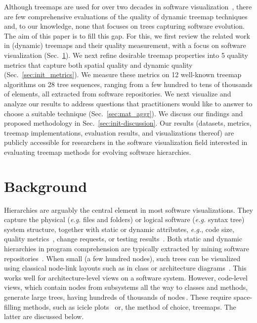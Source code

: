 Although treemaps are used for over two decades in software visualization~\citep{shneiderman92,schulz11_treesurvey,treevis,landesberger11}, there are few comprehensive evaluations of the quality of dynamic treemap techniques and, to our knowledge, none that focuses on trees capturing software evolution. The aim of this paper is to fill this gap. For this, we first review the related work in (dynamic) treemaps and their quality measurement, with a focus on software visualization (Sec.~\ref{sec:init-background}). We next refine desirable treemap properties into 5 quality metrics that capture both spatial quality and dynamic quality (Sec.~\ref{sec:init_metrics}). We measure these metrics on 12 well-known treemap algorithms on 28 tree sequences, ranging from a few hundred to tens of thousands of elements, all extracted from software repositories. We next visualize and analyze our results to address questions that practitioners would like to answer to choose a suitable technique (Sec.~\ref{sec:mat_aggr}). We discuss our findings and proposed methodology in Sec.~\ref{sec:init-discussion}. Our results (datasets, metrics, treemap implementations, evaluation results, and visualizations thereof) are publicly accessible for researchers in the software visualization field interested in evaluating treemap methods for evolving software hierarchies.

\section{Background}
\label{sec:init-background}
%
%
Hierarchies are arguably the central element in most software visualizations. They capture the physical (\emph{e.g.} files and folders) or logical software (\emph{e.g.} syntax tree) system structure, together with static or dynamic attributes, \emph{e.g.}, code size, quality metrics~\citep{lanza06}, change requests, or testing results~\citep{diehl08}. Both static and dynamic hierarchies in program comprehension are typically extracted by mining software repositories~\citep{lanza03,kagdi07}.
When small (a few hundred nodes), such trees can be visualized using classical node-link layouts such as in class or architecture diagrams~\citep{muller88,lanza03,telea02}. This works well for architecture-level views on a software system. However, code-level views, which contain nodes from subsystems all the way to classes and methods, generate large trees, having hundreds of thousands of nodes\,\citep{sunburst2}. These require space-filling methods, such as icicle plots~\citep{holten06,cornelissen07} or, the method of choice, treemaps. The latter are discussed below.


